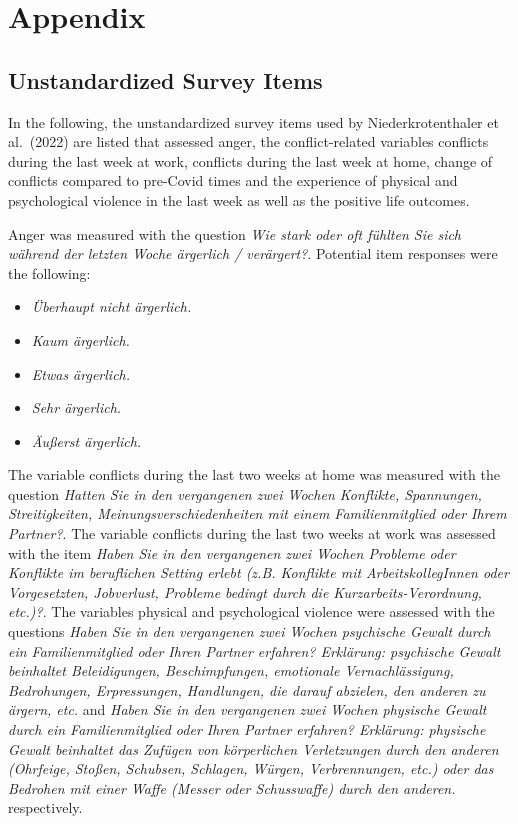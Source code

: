 \documentclass[
  english,
  jou,floatsintext]{apa7}
\begin{document}
\endgroup

\clearpage

\newpage

\newpage

\hypertarget{appendix}{%
\section{Appendix}\label{appendix}}

\hypertarget{unstandardized-survey-items}{%
\subsection{Unstandardized Survey Items}\label{unstandardized-survey-items}}

In the following, the unstandardized survey items used by Niederkrotenthaler et al.~(2022) are listed that assessed anger, the conflict-related variables conflicts during the last week at work, conflicts during the last week at home, change of conflicts compared to pre-Covid times and the experience of physical and psychological violence in the last week as well as the positive life outcomes.

Anger was measured with the question \textit{Wie stark oder oft fühlten Sie sich während der letzten Woche ärgerlich / verärgert?}. Potential item responses were the following:

\begin{itemize}
    \item \textit{Überhaupt nicht ärgerlich.}
    \item \textit{Kaum ärgerlich.}
    \item \textit{Etwas ärgerlich.}
    \item \textit{Sehr ärgerlich.}
    \item \textit{Äußerst ärgerlich.}
\end{itemize}

The variable conflicts during the last two weeks at home was measured with the question \textit{Hatten Sie in den vergangenen zwei Wochen Konflikte, Spannungen, Streitigkeiten, Meinungsverschiedenheiten mit einem Familienmitglied oder Ihrem Partner?}.
The variable conflicts during the last two weeks at work was assessed with the item \textit{Haben Sie in den vergangenen zwei Wochen Probleme oder Konflikte im beruflichen Setting erlebt (z.B. Konflikte mit ArbeitskollegInnen oder Vorgesetzten, Jobverlust, Probleme bedingt durch die Kurzarbeits-Verordnung, etc.)?}.
The variables physical and psychological violence were assessed with the questions \textit{Haben Sie in den vergangenen zwei Wochen psychische Gewalt durch ein Familienmitglied oder Ihren Partner erfahren? Erklärung: psychische Gewalt beinhaltet Beleidigungen, Beschimpfungen, emotionale Vernachlässigung, Bedrohungen, Erpressungen, Handlungen, die darauf abzielen, den anderen zu ärgern, etc.} and \textit{Haben Sie in den vergangenen zwei Wochen physische Gewalt durch ein Familienmitglied oder Ihren Partner erfahren? Erklärung: physische Gewalt beinhaltet das Zufügen von körperlichen Verletzungen durch den anderen (Ohrfeige, Stoßen, Schubsen, Schlagen, Würgen, Verbrennungen, etc.) oder das Bedrohen mit einer Waffe (Messer oder Schusswaffe) durch den anderen.} respectively.
\end{document}
